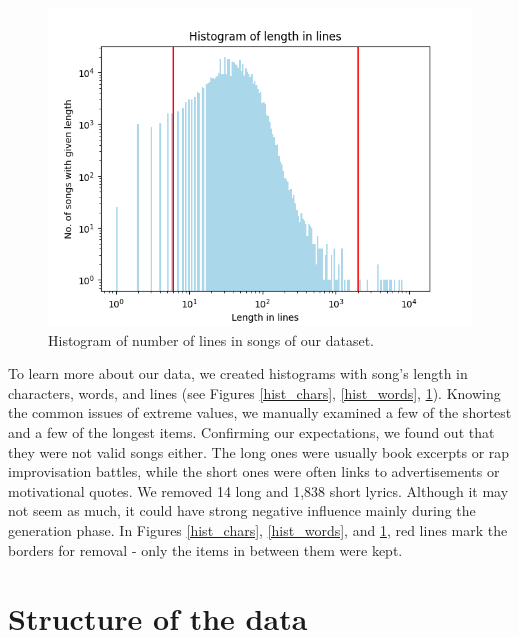 \begin{figure}[!h]\centering
	\includegraphics[width=\linewidth]{../img/histogram_song_length_in_lines.png}
	\caption{Histogram of number of lines in songs of our dataset.}\label{hist_lines}
	\endminipage\hfill
\end{figure}

To learn more about our data, we created histograms with song's length in characters, words, and lines (see Figures \ref{hist_chars}, \ref{hist_words}, \ref{hist_lines}). Knowing the common issues of extreme values, we manually examined a few of the shortest and a few of the longest items. Confirming our expectations, we found out that they were not valid songs either. The long ones were usually book excerpts or rap improvisation battles, while the short ones were often links to advertisements or motivational quotes. We removed 14 long and 1,838 short lyrics. Although it may not seem as much, it could have strong negative influence mainly during the generation phase. In Figures \ref{hist_chars}, \ref{hist_words}, and \ref{hist_lines}, red lines mark the borders for removal - only the items in between them were kept.


\section{Structure of the data}

